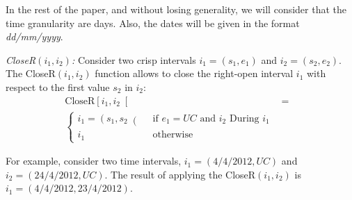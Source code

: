 In the rest of the paper, and without losing generality, we will consider that the time granularity are days. Also, the dates will be given in the format \emph{dd/mm/yyyy}.


\begin{definition}
\emph{CloseR$\left(i_1, i_2\right)$:}
\label{def:close-a-crisp-interval-r}
Consider two crisp intervals $i_1 = \left(s_1, e_1 \right)$ and $i_2 = \left(s_2, e_2\right)$. The CloseR$\left(i_1, i_2 \right)$ function allows to close the right-open interval $i_1$ with respect to the first value $s_2$ in $i_2$:
\begin{align}
\label{eq:close-a-crisp-interval}
\mbox{CloseR} \left[ i_1, i_2\right[ &=& \\ 
\begin{cases}
\nonumber
i_1 = \left(s_1,s_2 \right( & \mbox{ if } e_1 = UC \mbox{ and } i_2 \mbox{ During } i_1 \\
i_1 & \mbox{ otherwise}
\end{cases}
\end{align}
\end{definition}

For example, consider two time intervals, $i_1 = \left(4/4/2012, UC \right)$ and $i_2 = \left(24/4/2012, UC \right)$. The result of applying the CloseR$\left(i_1, i_2 \right)$ is $i_1 = \left(4/4/2012, 23/4/2012 \right)$.








%



